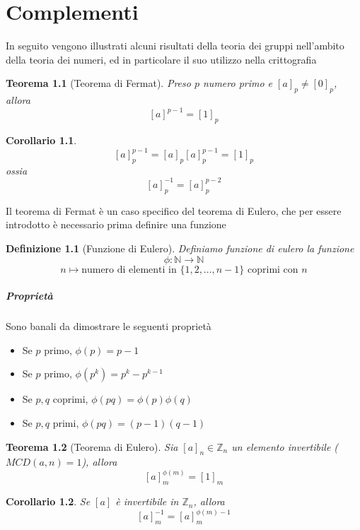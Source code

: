 \documentclass[a4paper]{report}
\newtheorem{theorem}{Teorema}
\newtheorem{definition}{Definizione}
\newtheorem{corollary}{Corollario}
\newcommand{\Z}{\ensuremath{\mathbb{Z}}}
\newcommand{\N}{\ensuremath{\mathbb{N}}}
\newcommand{\ra}{\ensuremath{\rightarrow}}
\begin{document}
\chapter{Complementi}
In seguito vengono illustrati alcuni risultati della teoria dei gruppi nell'ambito della teoria dei numeri, ed in particolare il suo utilizzo nella crittografia
\begin{theorem}[Teorema di Fermat]
    Preso $p$ numero primo e $[a]_p\neq[0]_p$, allora
    \[
        [a]^{p-1}=[1]_p
    \]
\end{theorem}
\begin{corollary}
    \[
        [a]_p^{p-1}=[a]_p[a]_p^{p-1}=[1]_p
    \]
    ossia
    \[
        [a]_p^{-1}=[a]_p^{p-2}
    \]
\end{corollary}
Il teorema di Fermat è un caso specifico del teorema di Eulero, che per essere introdotto è necessario prima definire una funzione
\begin{definition}[Funzione di Eulero]
    Definiamo funzione di eulero la funzione
    \[
        \phi:\N\ra\N
    \]
    \[
        n\mapsto\text{numero di elementi in }\{1,2,\dots,n-1\}\text{ coprimi con }n
    \]
\end{definition}
\paragraph{Proprietà} Sono banali da dimostrare le seguenti proprietà
\begin{itemize}
    \item Se $p$ primo, $\phi(p)=p-1$
    \item Se $p$ primo, $\phi(p^k)=p^k-p^{k-1}$
    \item Se $p,q$ coprimi, $\phi(pq)=\phi(p)\phi(q)$
    \item Se $p,q$ primi, $\phi(pq)=(p-1)(q-1)$
\end{itemize}
\begin{theorem}[Teorema di Eulero]
    Sia $[a]_n\in\Z_n$ un elemento invertibile ($MCD(a,n)=1$), allora
    \[
        [a]_m^{\phi(m)}=[1]_m
    \]
\end{theorem}
\begin{corollary}
    Se $[a]$ è invertibile in $\Z_n$, allora
    \[
        [a]_m^{-1}=[a]_m^{\phi(m)-1}
    \]
\end{corollary}
\pagebreak
\end{document}
